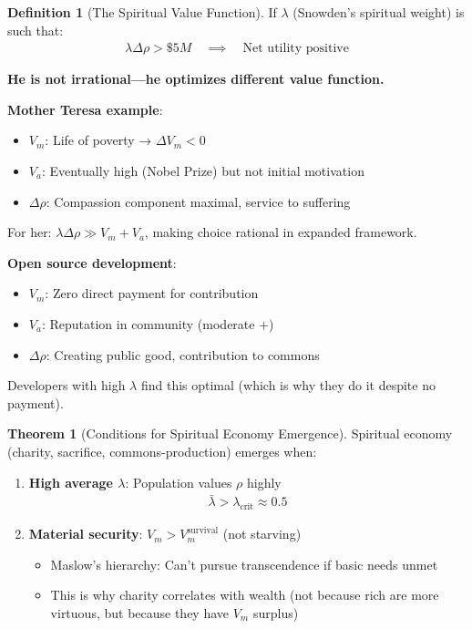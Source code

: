 \documentclass[11pt,a4paper]{article}
\theoremstyle{definition}
\newtheorem{definition}{Definition}[section]
\newtheorem{theorem}{Theorem}[section]
\theoremstyle{remark}
\begin{document}
\begin{enumerate}
\begin{definition}[The Spiritual Value Function]
If \(\lambda\) (Snowden's spiritual weight) is such that:
\begin{align}
\lambda \Delta\rho > \$5M \quad \implies \quad \text{Net utility positive}
\end{align}

\textbf{He is not irrational—he optimizes different value function.}

\textbf{Mother Teresa example}:
\begin{itemize}
    \item \(V_m\): Life of poverty → \(\Delta V_m < 0\)
    \item \(V_a\): Eventually high (Nobel Prize) but not initial motivation
    \item \(\Delta\rho\): Compassion component maximal, service to suffering
\end{itemize}

For her: \(\lambda \Delta\rho \gg V_m + V_a\), making choice rational in expanded framework.

\textbf{Open source development}:
\begin{itemize}
    \item \(V_m\): Zero direct payment for contribution
    \item \(V_a\): Reputation in community (moderate \(+\))
    \item \(\Delta\rho\): Creating public good, contribution to commons
\end{itemize}

Developers with high \(\lambda\) find this optimal (which is why they do it despite no payment).
\end{definition}

\begin{theorem}[Conditions for Spiritual Economy Emergence]
Spiritual economy (charity, sacrifice, commons-production) emerges when:

\begin{enumerate}
    \item \textbf{High average \(\lambda\)}: Population values \(\rho\) highly
        \begin{align}
        \bar{\lambda} > \lambda_{\text{crit}} \approx 0.5
        \end{align}
    
    \item \textbf{Material security}: \(V_m > V_m^{\text{survival}}\) (not starving)
        \begin{itemize}
            \item Maslow's hierarchy: Can't pursue transcendence if basic needs unmet
            \item This is why charity correlates with wealth (not because rich are more virtuous, but because they have \(V_m\) surplus)
        \end{itemize}
    

\end{enumerate}
\end{theorem}
\end{enumerate}
\end{document}
